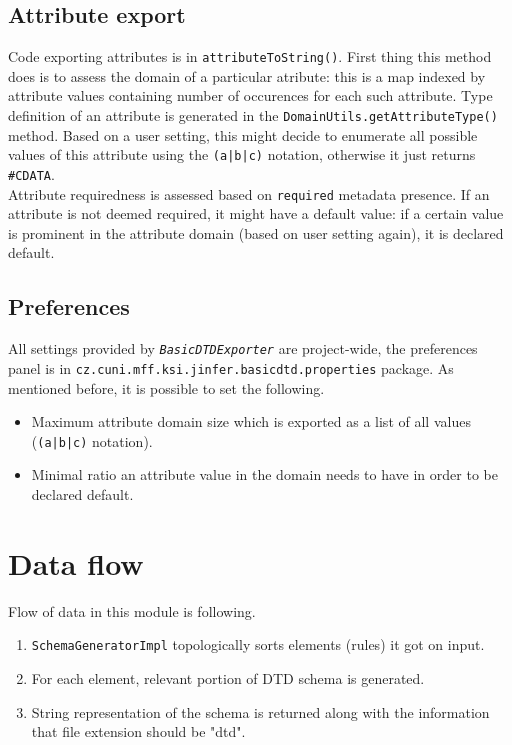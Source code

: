 \documentclass[a4paper,10pt,oneside]{article}
\newcommand{\code}[1]{\texttt{#1}}
\newcommand{\jmodule}[1]{\texttt{\textit{#1}}}
\begin{document}
\subsection{Attribute export}

Code exporting attributes is in \code{attributeToString()}. First thing this method does is to assess the domain of a particular atribute: this is a map indexed by attribute values containing number of occurences for each such attribute. Type definition of an attribute is generated in the \code{DomainUtils.getAttributeType()} method. Based on a user setting, this might decide to enumerate all possible values of this attribute using the \code{(a|b|c)} notation, otherwise it just returns \code{\#CDATA}.\\
Attribute requiredness is assessed based on \code{required} metadata presence. If an attribute is not deemed required, it might have a default value: if a certain value is prominent in the attribute domain (based on user setting again), it is declared default.

\subsection{Preferences}

All settings provided by \jmodule{BasicDTDExporter} are project-wide, the preferences panel is in \code{cz.cuni.mff.ksi.jinfer.basicdtd.properties} package. As mentioned before, it is possible to set the following. 
\begin{itemize}
	\item Maximum attribute domain size which is exported as a list of all values (\code{(a|b|c)} notation).
	\item Minimal ratio an attribute value in the domain needs to have in order to be declared default.
\end{itemize}

\section{Data flow}

Flow of data in this module is following.
\begin{enumerate}
	\item \code{SchemaGeneratorImpl} topologically sorts elements (rules) it got on input.
	\item For each element, relevant portion of DTD schema is generated.
	\item String representation of the schema is returned along with the information that file extension should be "dtd".
\end{enumerate}

\newpage


\end{document}

